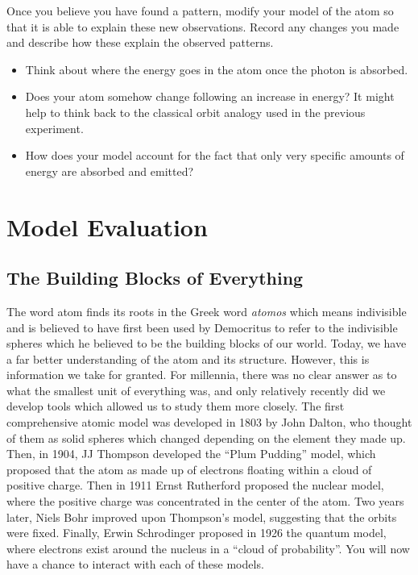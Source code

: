 \begin{steps}
	\item Once you believe you have found a pattern, modify your model of the atom so that it is able to explain these new observations. Record any changes you made and describe how these explain the observed patterns.
	\begin{itemize}
		\item Think about where the energy goes in the atom once the photon is absorbed.
		
		\item Does your atom somehow change following an increase in energy? It might help to think back to the classical orbit analogy used in the previous experiment.   
		
		\item How does your model account for the fact that only very specific amounts of energy are absorbed and emitted? 
	\end{itemize}
\end{steps}

\section{Model Evaluation}

\subsection{The Building Blocks of Everything}
 The word atom finds its roots in the Greek word \textit{atomos} which means indivisible and is believed to have first been used by Democritus to refer to the indivisible spheres which he believed to be the building blocks of our world. Today, we have a far better understanding of the atom and its structure. However, this is information we take for granted. For millennia, there was no clear answer as to what the smallest unit of everything was, and only relatively recently did we develop tools which allowed us to study them more closely. The first comprehensive atomic model was developed in 1803 by John Dalton, who thought of them as solid spheres which changed depending on the element they made up. Then, in 1904, JJ Thompson developed the ``Plum Pudding'' model, which proposed that the atom as made up of electrons floating within a cloud of positive charge. Then in 1911 Ernst Rutherford proposed the nuclear model, where the positive charge was concentrated in the center of the atom. Two years later, Niels Bohr improved upon Thompson's model, suggesting that the orbits were fixed. Finally, Erwin Schrodinger proposed in 1926 the quantum model, where electrons exist around the nucleus in a ``cloud of probability''. You will now have a chance to interact with each of these models.

